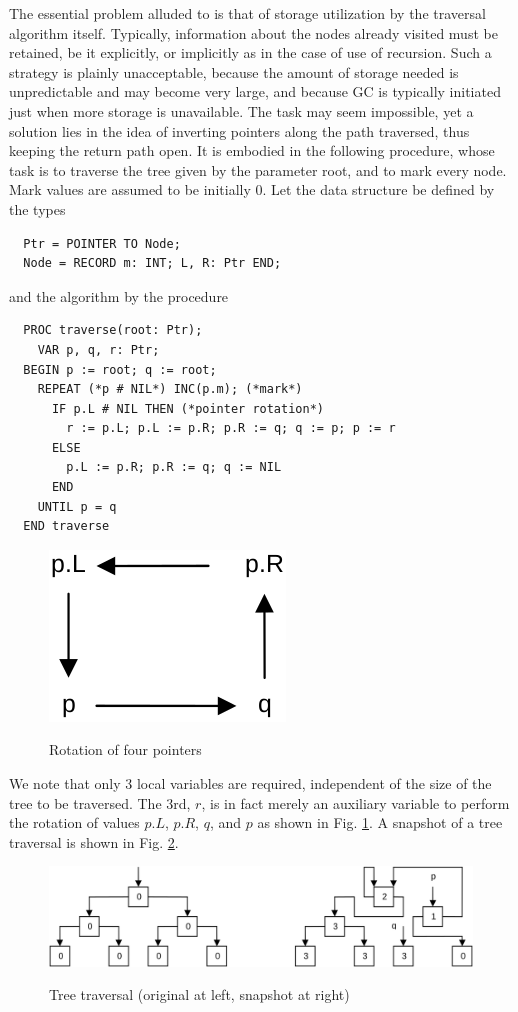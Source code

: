 The essential problem alluded to is that of storage utilization by the traversal algorithm itself.
Typically, information about the nodes already visited must be retained, be it explicitly, or
implicitly as in the case of use of recursion. Such a strategy is plainly unacceptable,
because the amount of storage needed is unpredictable and may become very large, and because
GC is typically initiated just when more storage is unavailable. The task may seem impossible,
yet a solution lies in the idea of inverting pointers along the path traversed, thus keeping
the return path open. It is embodied in the following procedure, whose task is to traverse
the tree given by the parameter root, and to mark every node. Mark values are assumed to
be initially 0. Let the data structure be defined by the types
\begin{verbatim}
  Ptr = POINTER TO Node;
  Node = RECORD m: INT; L, R: Ptr END;
\end{verbatim}
and the algorithm by the procedure
\begin{verbatim}
  PROC traverse(root: Ptr);
    VAR p, q, r: Ptr;
  BEGIN p := root; q := root;
    REPEAT (*p # NIL*) INC(p.m); (*mark*)
      IF p.L # NIL THEN (*pointer rotation*)
        r := p.L; p.L := p.R; p.R := q; q := p; p := r
      ELSE
        p.L := p.R; p.R := q; q := NIL
      END
    UNTIL p = q
  END traverse
\end{verbatim}
\begin{figure}[h!]
  \centering
  \includegraphics[width=.25\textwidth]{i/s}
  \label{fig:rotation}
  \caption{Rotation of four pointers}
\end{figure}
We note that only 3 local variables are required, independent of the size of the tree to be
traversed. The 3rd, $r$, is in fact merely an auxiliary variable to perform the rotation of
values $p.L$, $p.R$, $q$, and $p$ as shown in Fig. \ref{fig:rotation}. A snapshot of a tree
traversal is shown in Fig. \ref{fig:tree-traversal}.
\begin{figure}[h!]
  \centering
  \includegraphics[width=\textwidth]{i/t}
  \label{fig:tree-traversal}
  \caption{Tree traversal (original at left, snapshot at right)}
\end{figure}

